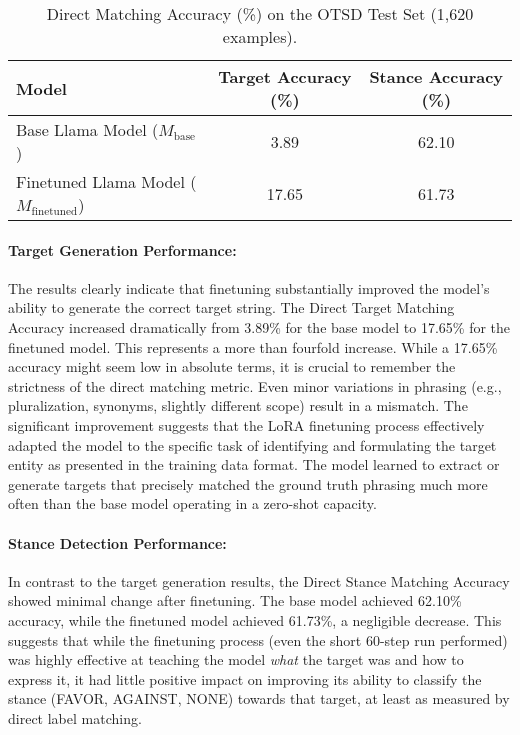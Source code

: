 \documentclass[twocolumn, 11pt,letterpaper]{article}
\begin{document}
\begin{table}[ht]
\centering
\caption{Direct Matching Accuracy (\%) on the OTSD Test Set (1,620 examples).}
\label{tab:results}
\begin{tabular}{@{}lcc@{}}
\toprule
Model & Target Accuracy (\%) & Stance Accuracy (\%) \\ \midrule
Base Llama Model ($M_{\text{base}}$) & 3.89 & 62.10 \\
Finetuned Llama Model ($M_{\text{finetuned}}$) & 17.65 & 61.73 \\ \bottomrule
\end{tabular}
\end{table}

\paragraph{Target Generation Performance:}
The results clearly indicate that finetuning substantially improved the model's ability to generate the correct target string. The Direct Target Matching Accuracy increased dramatically from 3.89\% for the base model to 17.65\% for the finetuned model. This represents a more than fourfold increase. While a 17.65\% accuracy might seem low in absolute terms, it is crucial to remember the strictness of the direct matching metric. Even minor variations in phrasing (e.g., pluralization, synonyms, slightly different scope) result in a mismatch. The significant improvement suggests that the LoRA finetuning process effectively adapted the model to the specific task of identifying and formulating the target entity as presented in the training data format. The model learned to extract or generate targets that precisely matched the ground truth phrasing much more often than the base model operating in a zero-shot capacity.

\paragraph{Stance Detection Performance:}
In contrast to the target generation results, the Direct Stance Matching Accuracy showed minimal change after finetuning. The base model achieved 62.10\% accuracy, while the finetuned model achieved 61.73\%, a negligible decrease. This suggests that while the finetuning process (even the short 60-step run performed) was highly effective at teaching the model \textit{what} the target was and how to express it, it had little positive impact on improving its ability to classify the stance (FAVOR, AGAINST, NONE) towards that target, at least as measured by direct label matching.
\end{document}
